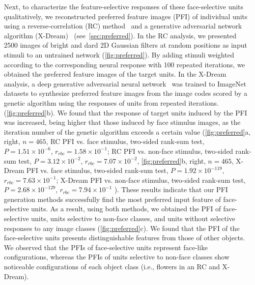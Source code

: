 \documentclass[sn-mathphys-num]{sn-jnl}%
\theoremstyle{thmstyleone}%
\theoremstyle{thmstyletwo}%
\theoremstyle{thmstylethree}%
\begin{document}
Next, to characterize the feature-selective responses of these face-selective units qualitatively,
we reconstructed preferred feature images (PFI) of individual units using a reverse-correlation (RC) method~\cite{bonin2011local} and a generative adversarial network algorithm (X-Dream)~\cite{ponce2019evolving} (see~\ref{sec:preferred}).
In the RC analysis, we presented 2500 images of bright and dard 2D Gaussian filters at random positions as input stimuli to an untrained network (\ref{fig:preferred}).
By adding stimuli weighted according to the corresponding neural response with 100 repeated iterations, we obtained the preferred feature images of the target units.
In the X-Dream analysis, a deep generative adversarial neural network~\cite{dosovitskiy2016generating} was trained to ImageNet datasets to synthesize preferred feature images from the image codes scored by a genetic algorithm using the responses of units from repeated iterations. (\ref{fig:preferred}b).
We found that the response of target units induced by the PFI was increased, being higher that those induced by face stimulus images, as the iteration number of the genetic algorithm exceeds a certain value 
(\ref{fig:preferred}a, right, $ n=465 $, 
RC PFI vs. face stimulus, two-sided rank-sum test, $ P=1.51 \times 10^{-6} $, $ r_{rbc} = 1.58 \times 10^{-1} $;
RC PFI vs. non-face stimulus, two-sided rank-sum test, $ P=3.12 \times 10^{-2} $, $ r_{rbc} = 7.07 \times 10^{-2} $,
\ref{fig:preferred}b, right, $ n=465 $, 
X-Dream PFI vs. face stimulus, two-sided rank-sum test, $ P=1.92 \times 10^{-119} $, $ r_{rbc} = 7.63 \times 10^{-1} $;
X-Dream PFI vs. non-face stimulus, two-sided rank-sum test, $ P = 2.68 \times 10^{-129} $, $ r_{rbc} = 7.94 \times 10^{-1} $
).
These results indicate that our PFI generation methods successfully find the most preferred input feature of face-selective units.
As a result, using both methods, we obtained the PFI of face-selective units, units selective to non-face classes, and units without selective responses to any image classes (\ref{fig:preferred}c).
We found that the PFI of the face-selective units presents distinguishable features from those of other objects.
We observed that the PFIs of face-selective units represent face-like configurations, whereas the PFIs of units selective to non-face classes show noticeable configurations of each object class (i.e., flowers in an RC and X-Dream).
\end{document}

